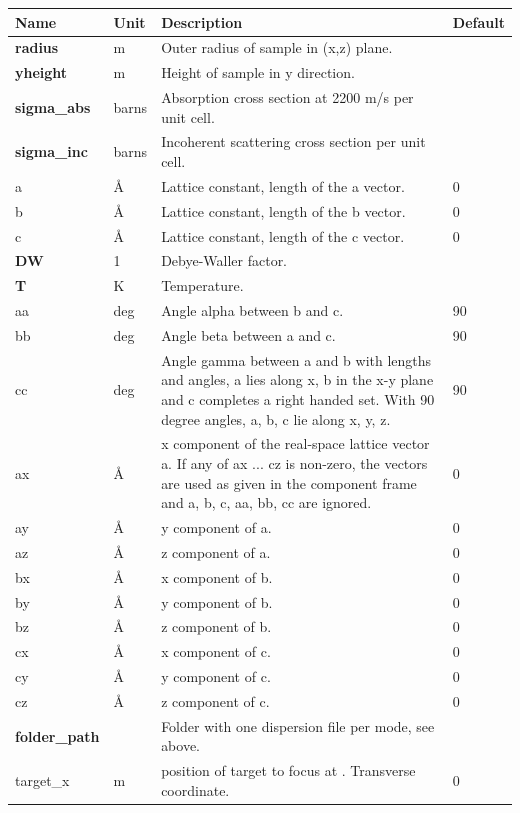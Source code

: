 \begin{longtable}{p{}p{}p{}p{}}
\toprule
\textbf{Name} & \textbf{Unit} & \textbf{Description} & \textbf{Default} \\
\midrule
\endhead
\textbf{radius} & m & Outer radius of sample in (x,z) plane. &  \\
\textbf{yheight} & m & Height of sample in y direction. &  \\
\textbf{sigma\_abs} & barns & Absorption cross section at 2200 m/s per unit cell. &  \\
\textbf{sigma\_inc} & barns & Incoherent scattering cross section per unit cell. &  \\
a & \AA{} & Lattice constant, length of the a vector. & 0 \\
b & \AA{} & Lattice constant, length of the b vector. & 0 \\
c & \AA{} & Lattice constant, length of the c vector. & 0 \\
\textbf{DW} & 1 & Debye-Waller factor. &  \\
\textbf{T} & K & Temperature. &  \\
aa & deg & Angle alpha between b and c. & 90 \\
bb & deg & Angle beta between a and c. & 90 \\
cc & deg & Angle gamma between a and b with lengths and angles, a lies along x, b in the x-y plane and c completes a right handed set. With 90 degree angles, a, b, c lie along x, y, z. & 90 \\
ax & \AA{} & x component of the real-space lattice vector a. If any of ax ... cz is non-zero, the vectors are used as given in the component frame and a, b, c, aa, bb, cc are ignored. & 0 \\
ay & \AA{} & y component of a. & 0 \\
az & \AA{} & z component of a. & 0 \\
bx & \AA{} & x component of b. & 0 \\
by & \AA{} & y component of b. & 0 \\
bz & \AA{} & z component of b. & 0 \\
cx & \AA{} & x component of c. & 0 \\
cy & \AA{} & y component of c. & 0 \\
cz & \AA{} & z component of c. & 0 \\
\textbf{folder\_path} &  & Folder with one dispersion file per mode, see above. &  \\
target\_x & m & position of target to focus at . Transverse coordinate. & 0 \\

\end{longtable}
